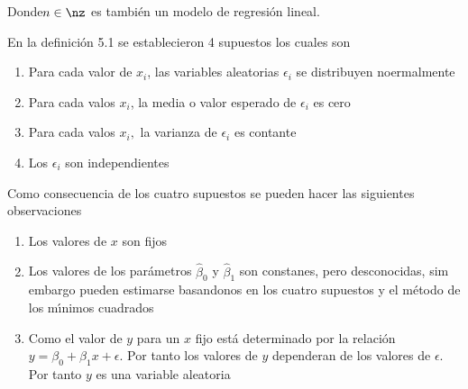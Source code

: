 Donde$n\in\nz$ es tambi\'{e}n un modelo de regresi\'{o}n lineal.

En la definici\'{o}n 5.1 se establecieron 4 supuestos los cuales son

\begin{enumerate}
\item Para cada valor de $x_{i}$, las variables aleatorias $\epsilon_{i}$ se
distribuyen noermalmente

\item Para cada valos $x_{i}$, la media o valor esperado de $\epsilon_{i}$ es cero

\item Para cada valos $x_{i},$ la varianza de $\epsilon_{i}$ es contante

\item Los $\epsilon_{i}$ son independientes
\end{enumerate}

Como consecuencia de los cuatro supuestos se pueden hacer las siguientes observaciones

\begin{enumerate}
\item Los valores de $x$ son fijos

\item Los valores de los par\'{a}metros $\hat{\beta}_{0}$ y $\hat{\beta}_{1}$
son constanes, pero desconocidas, sim embargo pueden estimarse basandonos en
los cuatro supuestos y el m\'{e}todo de los m\'{\i}nimos cuadrados

\item Como el valor de $y$ para un $x$ fijo est\'{a} determinado por la
relaci\'{o}n $y=\beta_{0}+\beta_{1}x+\epsilon$. Por tanto los valores de $y$
dependeran de los valores de $\epsilon.$ Por tanto $y$ es una variable aleatoria
\end{enumerate}

